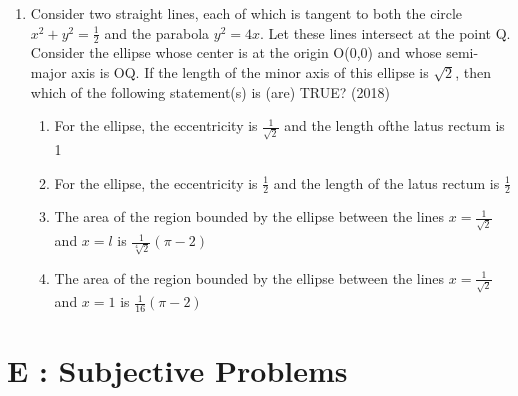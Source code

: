 \documentclass[12pt]{article}
\begin{document}
\begin{enumerate}
\begin{enumerate}
\end{enumerate}
\item Consider two straight lines, each of which is tangent to both the circle $x^2+y^2=\frac{1}{2}$ and the parabola $y^2=4x$. Let these lines intersect at the point Q. Consider the ellipse whose center is at the origin O(0,0) and whose semi-major axis is OQ. If the length of the minor axis of this ellipse is $\sqrt{2}$, then which of the following statement(s) is (are) TRUE? (2018)
\begin{enumerate}
\item For the ellipse, the eccentricity is $\frac{1}{\sqrt{2}}$ and the length ofthe latus rectum is 1
\item For the ellipse, the eccentricity is $\frac{1}{2}$ and the length of
the latus rectum is $\frac{1}{2}$
\item The area of the region bounded by the ellipse between the lines $x=\frac{1}{\sqrt{2}}$ and $x=l$ is $\frac{1}{\sqrt[4]{2}}(\pi-2)$
\item The area of the region bounded by the ellipse between the lines $x=\frac{1}{\sqrt{2}}$ and $x=1$ is $\frac{1}{16}(\pi-2)$
\end{enumerate}
\end{enumerate}

\section*{E  :  Subjective Problems}
\end{document}
